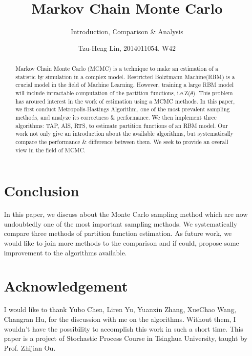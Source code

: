 \documentclass{sig-alternate-05-2015}
\begin{document}
\title{Markov Chain Monte Carlo}
\subtitle{Introduction, Comparison \& Analysis}
\author{
    \alignauthor Tzu-Heng Lin, 2014011054, W42\\
}


\maketitle
\begin{abstract}
Markov Chain Monte Carlo (MCMC) is a technique to make an estimation of a statistic by simulation in a complex model. Restricted Bolztmann Machine(RBM) is a crucial model in the field of Machine Learning. However, training a large RBM model will include intractable computation of the partition functions, i.e.Z($\theta$). This problem has aroused interest in the work of estimation using a MCMC methods.
In this paper, we first conduct Metropolis-Hastings Algorithm, one of the most prevalent sampling methods, and analyze its correctness \& performance. We then implement three algorithms: TAP, AIS, RTS, to estimate partition functions of an RBM model. Our work not only give an introduction about the available algorithms, but systematically compare the performance \& difference between them. We seek to provide an overall view in the field of MCMC.
\end{abstract}




%
%
\printccsdesc



\newpage

\newpage





\newpage
\section{Conclusion} \label{sec:conclusion}
In this paper, we discuss about the Monte Carlo sampling method which are now undoubtedly one of the most important sampling methods. We systematically compare three methods of partition function estimation. As future work, we would like to join more methods to the comparison and if could, propose some improvement to the algorithms available.


\renewcommand{\baselinestretch}{1.1}
\balance

\small

\section{Acknowledgement} \label{sec:acknowledgement}
I would like to thank Yubo Chen, Liren Yu, Yuanxin Zhang, XueChao Wang, Changran Hu, for the discussion with me on the algorithms. Without them, I wouldn't have the possibility to accomplish this work in such a short time. This paper is a project of Stochastic Process Course in Tsinghua University, taught by Prof. Zhijian Ou.




	
\end{document}
